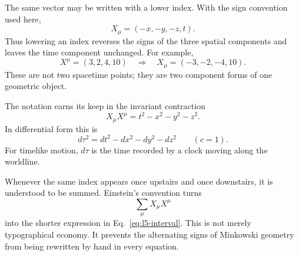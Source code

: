 \begin{classroomqa}
\end{classroomqa}

The same vector may be written with a lower index. With the sign convention
used here,
\begin{equation}
X_\mu=(-x,-y,-z,t).
\end{equation}
Thus lowering an index reverses the signs of the three spatial components and
leaves the time component unchanged. For example,
\begin{equation}
X^\mu=(3,2,4,10)
\quad\Longrightarrow\quad
X_\mu=(-3,-2,-4,10).
\end{equation}
These are not two spacetime points; they are two component forms of one
geometric object.

\begin{classroomqa}
\end{classroomqa}

The notation earns its keep in the invariant contraction
\begin{equation}
X_\mu X^\mu=t^2-x^2-y^2-z^2.
\label{eq:l5-interval}
\end{equation}
In differential form this is
\begin{equation}
d\tau^2=dt^2-dx^2-dy^2-dz^2
\qquad (c=1).
\label{eq:l5-proper-time}
\end{equation}
For timelike motion, \(d\tau\) is the time recorded by a clock moving along
the worldline.

Whenever the same index appears once upstairs and once downstairs, it is
understood to be summed. Einstein's convention turns
\begin{equation}
\sum_{\mu}X_\mu X^\mu
\end{equation}
into the shorter expression in Eq.~\eqref{eq:l5-interval}. This is not merely
typographical economy. It prevents the alternating signs of Minkowski
geometry from being rewritten by hand in every equation.

